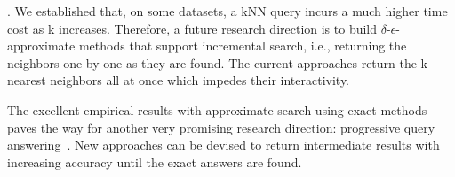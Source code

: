 {%







. We established that, on some datasets, a kNN query incurs a much higher time cost as k increases. Therefore, a future research direction is to build $\delta$-$\epsilon$-approximate methods that support incremental search, i.e., returning the neighbors one by one as they are found. The current approaches return the k nearest neighbors all at once which impedes their interactivity. 

 The excellent empirical results with approximate search using exact methods paves the way for another very promising research direction: progressive query answering~\cite{DBLP:conf/edbt/GogolouTPB19}. 
New approaches can be devised to return intermediate results %
with increasing accuracy until the exact answers are found.

}

